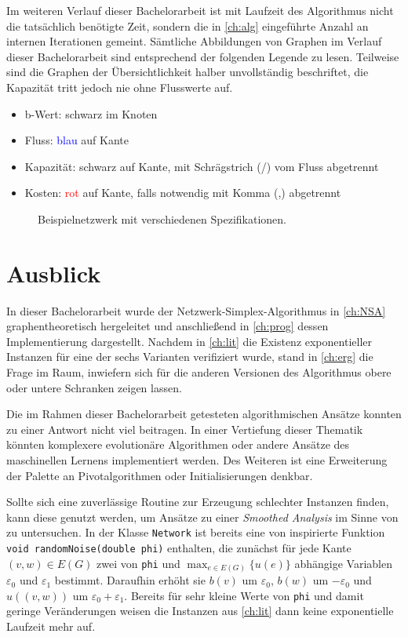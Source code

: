\documentclass[11pt,a4paper,twoside,ngerman,openany,bibliography=totoc]{scrbook}
\theoremstyle{plain}
\theoremstyle{definition}
\begin{document}
Im weiteren Verlauf dieser Bachelorarbeit ist mit Laufzeit des Algorithmus nicht die tatsächlich benötigte Zeit, sondern die in \cref{ch:alg} eingeführte Anzahl an internen Iterationen gemeint. Sämtliche Abbildungen von Graphen im Verlauf dieser Bachelorarbeit sind entsprechend der folgenden Legende zu lesen. Teilweise sind die Graphen der Übersichtlichkeit halber unvollständig beschriftet, die Kapazität tritt jedoch nie ohne Flusswerte auf.
\begin{itemize}[topsep=5pt]\itemsep0em
    \item b-Wert: schwarz im Knoten
    \item Fluss: \textcolor{blue}{blau} auf Kante
    \item Kapazität: schwarz auf Kante, mit Schrägstrich (/) vom Fluss abgetrennt
    \item Kosten: \textcolor{red}{rot} auf Kante, falls notwendig mit Komma (,) abgetrennt
\end{itemize}

\begin{figure}[h]\centering
    
    \caption{Beispielnetzwerk mit verschiedenen Spezifikationen.}
    \label{fig:legende}
\end{figure}






\chapter{Ausblick}\label{ch:outro}
In dieser Bachelorarbeit wurde der Netzwerk-Simplex-Algorithmus in \cref{ch:NSA} graphentheoretisch hergeleitet und anschließend in \cref{ch:prog} dessen Implementierung dargestellt. Nachdem in \cref{ch:lit} die Existenz exponentieller Instanzen für eine der sechs Varianten verifiziert wurde, stand in \cref{ch:erg} die Frage im Raum, inwiefern sich für die anderen Versionen des Algorithmus obere oder untere Schranken zeigen lassen.

Die im Rahmen dieser Bachelorarbeit getesteten algorithmischen Ansätze konnten zu einer Antwort nicht viel beitragen. In einer Vertiefung dieser Thematik könnten komplexere evolutionäre Algorithmen oder andere Ansätze des maschinellen Lernens implementiert werden. Des Weiteren ist eine Erweiterung der Palette an Pivotalgorithmen oder Initialisierungen denkbar.

Sollte sich eine zuverlässige Routine zur Erzeugung schlechter Instanzen finden, kann diese genutzt werden, um Ansätze zu einer \emph{Smoothed Analysis} im Sinne von \cite{Roglin} zu untersuchen. In der Klasse \lstinline|Network| ist bereits eine von \cite{betreuer} inspirierte Funktion \lstinline|void randomNoise(double phi)| enthalten, die zunächst für jede Kante $(v,w)\in E(G)$ zwei von \lstinline|phi| und $\max_{e\in E(G)}\{u(e)\}$ abhängige Variablen $\varepsilon_0$ und $\varepsilon_1$ bestimmt. Daraufhin erhöht sie $b(v)$ um $\varepsilon_0$, $b(w)$ um $-\varepsilon_0$ und $u((v,w))$ um $\varepsilon_0+\varepsilon_1$. Bereits für sehr kleine Werte von \lstinline|phi| und damit geringe Veränderungen weisen die Instanzen aus \cref{ch:lit} dann keine exponentielle Laufzeit mehr auf.
\end{document}
